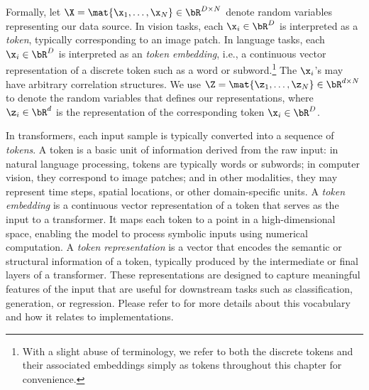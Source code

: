 \documentclass[../../book-main.tex]{subfiles}
\begin{document}
Formally, let \(\X = \mat{\x_{1}, \dots, \x_{N}} \in \bR^{D \times
N}\) denote random variables representing our data source. In vision
tasks, each \(\x_{i} \in \bR^{D}\) is interpreted as a
\textit{token}, typically corresponding to an image patch. In
language tasks, each \(\x_{i} \in \bR^{D}\) is interpreted as an
\textit{token embedding}, i.e., a continuous vector representation of
a discrete token such as a word or subword.\footnote{With a slight
    abuse of terminology, we refer to both the discrete tokens and their
    associated embeddings simply as tokens throughout this chapter for
convenience.}  %
The \(\x_{i}\)'s may have arbitrary correlation structures. We use
\(\Z = \mat{\z_{1}, \dots, \z_{N}} \in \bR^{d \times N}\) to denote
the random variables that defines our representations, where \(\z_{i}
\in \bR^{d}\) is the representation of the corresponding token \(\x_i
\in \bR^{D}\).%

\begin{remark}
    In transformers, each input sample is typically converted into a
    sequence of {\em tokens}. A token is a basic unit of information
    derived from the raw input: in natural language processing,
    tokens are typically words or subwords; in computer vision, they
    correspond to image patches; and in other modalities, they may
    represent time steps, spatial locations, or other domain-specific
    units. A {\em token embedding} is a continuous vector
    representation of a token that serves as the input to a
    transformer. It maps each token to a point in a high-dimensional
    space, enabling the model to process symbolic inputs using
    numerical computation.
    A {\em token representation} is a vector that encodes the
    semantic or structural information of a token, typically produced
    by the intermediate or final layers of a transformer. These
    representations are designed to capture meaningful features of
    the input that are useful for downstream tasks such as
    classification, generation, or regression. Please refer to
     for more details about this
    vocabulary and how it relates to implementations.
\end{remark}
\end{document}
